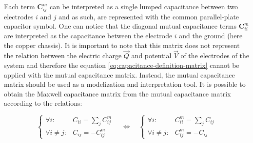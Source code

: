 Each term $\bm{C}_{ij}^m$ can be interpreted as a single lumped capacitance between two electrodes $i$ and $j$ and as such, are represented with the common parallel-plate capacitor symbol. One can notice that the diagonal mutual capacitance terms $\bm{C}_{ii}^m$ are interpreted as the capacitance between the electrode $i$ and the ground (here the copper chassis). It is important to note that this matrix does not represent the relation between the electric charge $\vec{Q}$ and potential $\vec{V}$ of the electrodes of the system and therefore the equation \ref{eq:capacitance-definition-matrix} cannot be applied with the mutual capacitance matrix. Instead, the mutual capacitance matrix should be used as a modelization and interpretation tool. It is possible to obtain the Maxwell capacitance matrix from the mutual capacitance matrix according to the relations:


\begin{equation} 
\label{eq:mutual-to-maxwell}
\left\lbrace
\begin{array}{lc}
\forall i :& C_{ii} = \sum_j C_{ij}^m \\
\forall i \neq j:&  C_{ij} = - C_{ij}^m
\end{array}
\right.
\quad \Leftrightarrow \quad
\left\lbrace
\begin{array}{lc}
\forall i :& C_{ii}^m = \sum_j C_{ij} \\
\forall i \neq j:&  C_{ij}^m = - C_{ij}
\end{array}
\right.
\end{equation}

